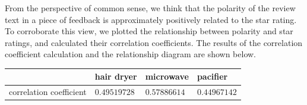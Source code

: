 \documentclass{mcmthesis}
\begin{document}
    From the perspective of common sense, we think that the polarity of the review text in a piece of feedback is approximately positively related to the star rating. To corroborate this view, we plotted the relationship between polarity and star ratings, and calculated their correlation coefficients. The results of the correlation coefficient calculation and the relationship diagram are shown below.
    
    
    \begin{center}
        \begin{tabular}{|l|l|l|l|}
        \hline
                    & hair dryer   & microwave    & pacifier     \\ \hline
            correlation coefficient & $0.49519728$ & $0.57886614$ & $0.44967142$ \\ \hline
        \end{tabular}
    \end{center}
    
\end{document}
